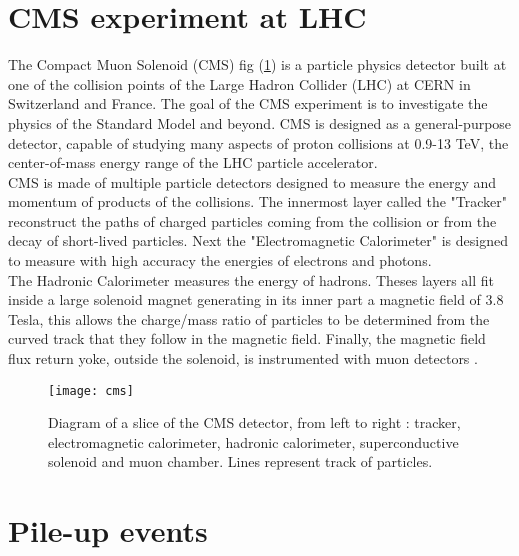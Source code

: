 \label{chap:premierchapitre}

\section{CMS experiment at LHC}

The Compact Muon Solenoid (CMS) fig (\ref{cms}) is a particle physics detector built at one of the collision points of the Large Hadron Collider
(LHC) at CERN in Switzerland and France. The goal of the CMS experiment is to investigate the physics of the Standard Model and beyond.
CMS is designed as a general-purpose detector, capable of studying many aspects of proton collisions at 0.9-13 TeV, the
center-of-mass energy range of the LHC particle accelerator.\\
CMS is made of multiple particle detectors designed to measure the energy and momentum of products of the collisions.
The innermost layer called the "Tracker" reconstruct the paths of charged particles coming from the collision or from the
decay of short-lived particles.
Next the "Electromagnetic Calorimeter" is designed to measure with high accuracy the energies of electrons and
photons.\\
The Hadronic Calorimeter measures the energy of hadrons.%
Theses layers all fit inside a large solenoid magnet generating in its inner part a magnetic field of 3.8 Tesla, this allows the charge/mass ratio of particles to be
determined from the curved track that they follow in the magnetic field.
Finally, the magnetic field flux return yoke, outside the solenoid, is instrumented with muon detectors \cite{CMS2008}.

\begin{figure}[h!]
  \centering
  \texttt{[image: cms]}\\[1cm]
  \caption{Diagram of a slice of the CMS detector, from left to right : tracker, electromagnetic calorimeter, hadronic
  calorimeter, superconductive solenoid and muon chamber. Lines represent track of particles.}
  \label{cms}
\end{figure}


\section{Pile-up events}

